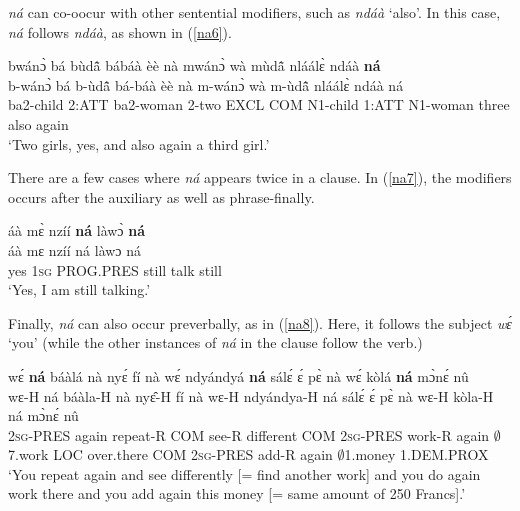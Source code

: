 {\itshape ná} can co-oocur with other sentential modifiers, such as {\itshape ndáà} `also'. In this case, {\itshape ná} follows {\itshape ndáà}, as shown in (\ref{na6}).

\begin{exe} 
\ex\label{na6} 
  \glll  bwánɔ̀ bá bùdã̂ bábáà èè nà mwánɔ̀ wà mùdã̂ nláálɛ̀ ndáà {\bfseries ná} \\
         b-wánɔ̀ bá b-ùdã̂ bá-báà èè nà m-wánɔ̀ wà m-ùdã̂ nláálɛ̀ ndáà ná \\
         ba2-child 2:ATT ba2-woman 2-two EXCL COM N1-child 1:ATT N1-woman three also again   \\
    \trans `Two girls, yes, and also again a third girl.'
\end{exe}


There are a few cases where {\itshape ná} appears twice in a clause. In (\ref{na7}), the modifiers occurs after the auxiliary as well as phrase-finally.

\begin{exe} 
\ex\label{na7}
  \glll     áà mɛ̀ nzíí {\bfseries ná} làwɔ̀ {\bfseries ná} \\
            áà mɛ nzíí ná làwɔ ná \\
              yes 1\textsc{sg} PROG.PRES still talk still \\
    \trans `Yes, I am still talking.'
\end{exe}


Finally, {\itshape ná} can also occur preverbally, as in (\ref{na8}). Here, it follows the subject {\itshape wɛ́} `you' (while the other instances of {\itshape ná} in the clause follow the verb.) 

\begin{exe} 
\ex\label{na8} 
  \glll wɛ́ {\bfseries ná} báàlá nà nyɛ́ fí nà wɛ́ ndyándyá {\bfseries ná} sálɛ́ ɛ́ pɛ̀ nà wɛ́ kòlá {\bfseries ná} mɔ̀nɛ́ nû \\
      wɛ-H ná báàla-H nà nyɛ̂-H fí nà wɛ-H ndyándya-H ná sálɛ́ ɛ́ pɛ̀ nà wɛ-H kòla-H ná mɔ̀nɛ́ nû \\
         2\textsc{sg}-PRES again repeat-R COM see-R different COM 2\textsc{sg}-PRES work-R again $\emptyset$7.work LOC over.there COM 2\textsc{sg}-PRES add-R again $\emptyset$1.money 1.DEM.PROX \\
    \trans `You repeat again and see differently [= find another work] and you do again work there and you add again this money [= same amount of 250 Francs].'
\end{exe}

